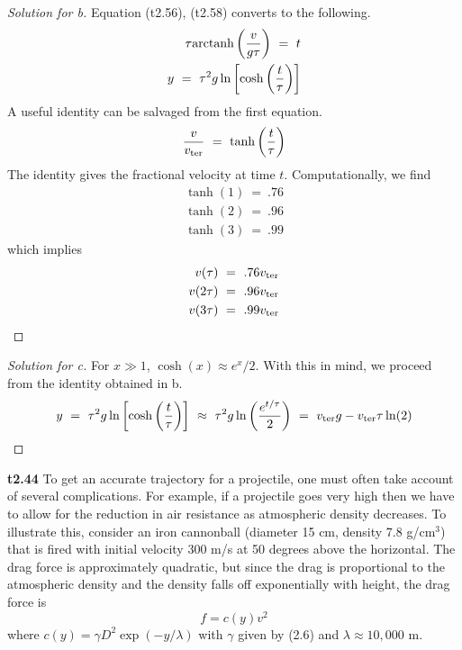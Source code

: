 \documentclass{article}
\numberwithin{equation}{section}
\begin{document}
\begin{proof}[Solution for b]
    Equation (t2.56), (t2.58) converts to the following. 
    \begin{eqnarray}
        \tau \textnormal{arctanh}\left(
            \frac v {g\tau}
        \right) \ = \ t \\ 
        y \ = \ \tau^2 g \ln\left[
            \cosh\left(
                \frac t \tau
            \right)
        \right]
    \end{eqnarray}
    A useful identity can be salvaged from the first equation. 
    \begin{eqnarray}
        \frac v {v_{\rm ter}} \ = \ \tanh\left(\frac t \tau\right)
    \end{eqnarray}
    The identity gives the fractional velocity at time $t$. Computationally, 
    we find 
    \begin{eqnarray*}
        \tanh(1) \ = \ .76 \\ 
        \tanh(2) \ = \ .96 \\ 
        \tanh(3) \ = \ .99 
    \end{eqnarray*}
    which implies 
    \begin{eqnarray*}
        v(\tau) \ = \ .76 v_{\rm ter} \\ 
        v(2\tau) \ = \ .96 v_{\rm ter}\\
    v(3\tau) \ = \ .99v_{\rm ter}
    \end{eqnarray*}
\end{proof}

\begin{proof}[Solution for c]
    For $x \gg 1$, $\cosh(x) \approx e^x / 2$. With this in mind, 
    we proceed from the identity obtained in b. 
    \begin{eqnarray}
        y \ = \ 
        \tau^2 g \ln \left[
            \cosh\left(
                \frac t \tau
            \right)
        \right] \ \approx \  
        \tau^2 g \ln\left(
            \frac{e^{t/\tau}} 2
        \right) \ = \  
        v_{\rm ter} g - v_{\rm ter} \tau \ln(2)
    \end{eqnarray}
\end{proof}

\textbf{t2.44}
 To get an accurate trajectory for a projectile, one must often take account of several complications. For example, if a projectile goes very high then we have to allow for the reduction in air resistance as atmospheric density decreases. To illustrate this, consider an iron cannonball (diameter 15 cm, density 7.8 g/cm$^3$) that is fired with initial velocity 300 m/s at 50 degrees above the horizontal. The drag force is approximately quadratic, but since the drag is proportional to the atmospheric density and the density falls off exponentially with height, the drag force is 
\[
f = c(y)v^2
\]
where \(c(y) = \gamma D^2 \exp(-y/\lambda)\) with \(\gamma\) given by (2.6) and \(\lambda \approx 10,000 \text{ m}\).
\end{document}
